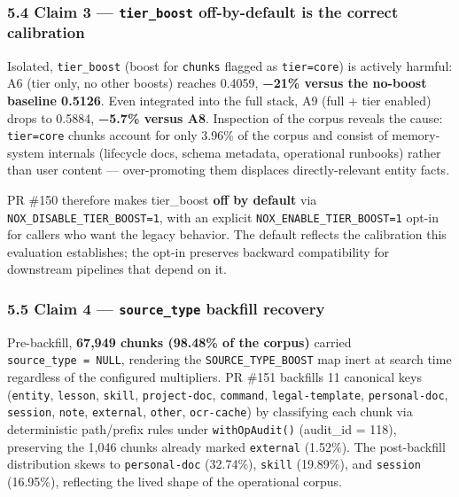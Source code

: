 \documentclass[
]{article}
\begin{document}
\subsubsection{\texorpdfstring{5.4 Claim 3 --- \texttt{tier\_boost}
off-by-default is the correct
calibration}{5.4 Claim 3 --- tier\_boost off-by-default is the correct calibration}}\label{claim-3-tier_boost-off-by-default-is-the-correct-calibration}

Isolated, \texttt{tier\_boost} (boost for \texttt{chunks} flagged as
\texttt{tier=\textquotesingle{}core\textquotesingle{}}) is actively
harmful: A6 (tier only, no other boosts) reaches 0.4059, \textbf{−21\%
versus the no-boost baseline 0.5126}. Even integrated into the full
stack, A9 (full + tier enabled) drops to 0.5884, \textbf{−5.7\% versus
A8}. Inspection of the corpus reveals the cause:
\texttt{tier=\textquotesingle{}core\textquotesingle{}} chunks account
for only 3.96\% of the corpus and consist of memory-system internals
(lifecycle docs, schema metadata, operational runbooks) rather than user
content --- over-promoting them displaces directly-relevant entity
facts.

PR \#150 therefore makes tier\_boost \textbf{off by default} via
\texttt{NOX\_DISABLE\_TIER\_BOOST=1}, with an explicit
\texttt{NOX\_ENABLE\_TIER\_BOOST=1} opt-in for callers who want the
legacy behavior. The default reflects the calibration this evaluation
establishes; the opt-in preserves backward compatibility for downstream
pipelines that depend on it.

\subsubsection{\texorpdfstring{5.5 Claim 4 --- \texttt{source\_type}
backfill
recovery}{5.5 Claim 4 --- source\_type backfill recovery}}\label{claim-4-source_type-backfill-recovery}

Pre-backfill, \textbf{67,949 chunks (98.48\% of the corpus)} carried
\texttt{source\_type\ =\ NULL}, rendering the
\texttt{SOURCE\_TYPE\_BOOST} map inert at search time regardless of the
configured multipliers. PR \#151 backfills 11 canonical keys
(\texttt{entity}, \texttt{lesson}, \texttt{skill}, \texttt{project-doc},
\texttt{command}, \texttt{legal-template}, \texttt{personal-doc},
\texttt{session}, \texttt{note}, \texttt{external}, \texttt{other},
\texttt{ocr-cache}) by classifying each chunk via deterministic
path/prefix rules under \texttt{withOpAudit()} (audit\_id = 118),
preserving the 1,046 chunks already marked \texttt{external} (1.52\%).
The post-backfill distribution skews to \texttt{personal-doc} (32.74\%),
\texttt{skill} (19.89\%), and \texttt{session} (16.95\%), reflecting the
lived shape of the operational corpus.
\end{document}
